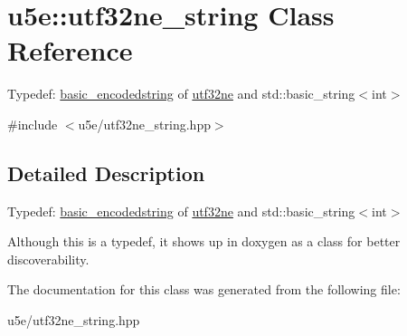 \hypertarget{classu5e_1_1utf32ne__string}{}\section{u5e\+:\+:utf32ne\+\_\+string Class Reference}
\label{classu5e_1_1utf32ne__string}


Typedef\+: \hyperlink{classu5e_1_1basic__encodedstring}{basic\+\_\+encodedstring} of \hyperlink{classu5e_1_1utf32ne}{utf32ne} and std\+::basic\+\_\+string$<$int$>$  




{\ttfamily \#include $<$u5e/utf32ne\+\_\+string.\+hpp$>$}



\subsection{Detailed Description}
Typedef\+: \hyperlink{classu5e_1_1basic__encodedstring}{basic\+\_\+encodedstring} of \hyperlink{classu5e_1_1utf32ne}{utf32ne} and std\+::basic\+\_\+string$<$int$>$ 

Although this is a typedef, it shows up in doxygen as a class for better discoverability. 

The documentation for this class was generated from the following file\+:\begin{DoxyCompactItemize}
\item 
u5e/utf32ne\+\_\+string.\+hpp\end{DoxyCompactItemize}
